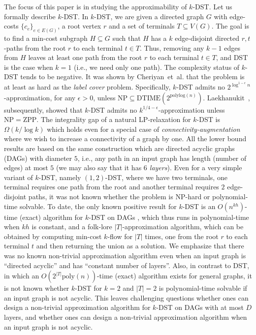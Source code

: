 \documentclass[11pt]{article}
\theoremstyle{definition}
\theoremstyle{remark}
\newcommand{\poly}{\mathrm{poly}}
\newcommand{\polylog}{\mathrm{polylog}}
\begin{document}
The focus of this paper is in studying the approximability of $k$-DST.
Let us formally describe $k$-DST. 
In $k$-DST, we are given a directed graph $G$ with edge-costs
$\{c_e\}_{e\in E(G)}$, a root vertex $r$ and 
a set of terminals $T\subseteq V(G)$.
The goal is to find a min-cost subgraph $H\subseteq G$ such that
$H$ has a $k$ edge-disjoint directed $r,t$-paths from the root $r$ to
each terminal $t\in T$. 
Thus, removing any $k-1$ edges from $H$ leaves at least one path from
the root $r$ to each terminal $t\in T$,
and DST is the case when $k=1$ (i.e., we need only one path).
The complexity status of $k$-DST tends to be negative. 
It was shown by Cheriyan~et~al. \cite{CheriyanLNV14} that
the problem is at least as hard as the {\em label cover} problem.
Specifically, $k$-DST admits no
$2^{\log^{1-\epsilon}n}$-approximation, for any $\epsilon>0$,
unless $\mathrm{NP}\subseteq\mathrm{DTIME}(2^{\polylog(n)})$.
Laekhanukit~\cite{Laekhanukit14}, subsequently, showed that
$k$-DST admits no $k^{1/4-\epsilon}$-approximation 
unless $\mathrm{NP}=\mathrm{ZPP}$.
The integrality gap of a natural LP-relaxation for $k$-DST is
$\Omega(k/\log k)$ which holds even for a special case of 
{\em connectivity-augmentation} where we wish to increase 
a connectivity of a graph by one.
All the lower bound results are based on the same construction
which are directed acyclic graphs (DAGs) with diameter $5$, i.e.,
any path in an input graph has length (number of edges) at most $5$
(we may also say that it has {\em $6$ layers}).
Even for a very simple variant of $k$-DST, namely $(1,2)$-DST, 
where we have two terminals,
one terminal requires one path from the root and 
another terminal requires $2$ edge-disjoint paths, 
it was not known whether the problem is NP-hard or 
polynomial-time solvable.
To date, the only known positive result for $k$-DST is 
an $O(n^{kh})$-time (exact) algorithm  for $k$-DST on DAGs
\cite{CheriyanLNV14}, which thus runs in polynomial-time when $kh$ is  
constant,
and a folk-lore $|T|$-approximation algorithm, which can
be obtained by computing min-cost $k$-flow for $|T|$ times, 
one from the root $r$ to each terminal $t$
and then returning the union as a solution.
We emphasize that there was no known non-trivial approximation
algorithm even when an input graph is ``directed acyclic'' and 
has ``constant number of layers''.
Also, in contrast to DST, in which an $O(2^{|T|}\poly(n))$-time
(exact) algorithm exists for general graphs,
it is not known whether $k$-DST for $k=2$ and $|T|=2$ is
polynomial-time solvable if an input graph is not acyclic.
This leaves challenging questions whether ones can design a non-trivial 
approximation algorithm for $k$-DST on DAGs with at most $D$ layers,
and whether ones can design a non-trivial approximation algorithm
when an input graph is not acyclic.
\end{document}
